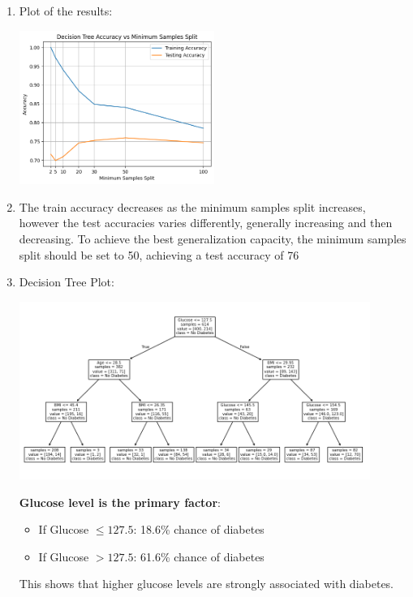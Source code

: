\documentclass{article}
\begin{document}
\begin{enumerate}[leftmargin=\labelsep]
\begin{enumerate}[leftmargin=\labelsep]
\item Plot of the results:
    \begin{center}
        \includegraphics[width=0.5\textwidth]{img/tree_acc_vs_split.png} 
    \end{center}

\item The train accuracy decreases as the minimum samples split increases, however the test accuracies varies differently, generally increasing and then decreasing. To achieve the best generalization capacity, the minimum samples split should be set to 50, achieving a test accuracy of 76%

\item Decision Tree Plot:
    \begin{center}
        \includegraphics[width=0.9\textwidth]{img/tree_plot.png} 
    \end{center}

    \textbf{Glucose level is the primary factor}:
    \begin{itemize}
        \item If Glucose $\leq 127.5$: 18.6\% chance of diabetes
        \item If Glucose $> 127.5$: 61.6\% chance of diabetes
    \end{itemize}
    This shows that higher glucose levels are strongly associated with diabetes.


\end{enumerate}
\end{enumerate}
\end{document}
